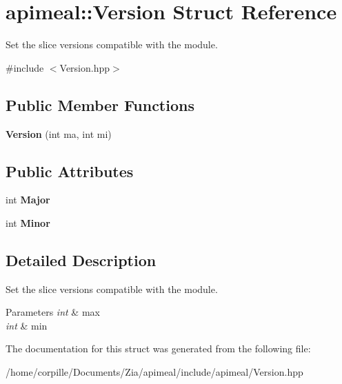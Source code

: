 \hypertarget{structapimeal_1_1Version}{\section{apimeal\-:\-:Version Struct Reference}
\label{structapimeal_1_1Version}
}


Set the slice versions compatible with the module.  




{\ttfamily \#include $<$Version.\-hpp$>$}

\subsection*{Public Member Functions}
\begin{DoxyCompactItemize}
\item 
\hypertarget{structapimeal_1_1Version_a2709f76d935fe5d194b469a9923b515d}{{\bfseries Version} (int ma, int mi)}\label{structapimeal_1_1Version_a2709f76d935fe5d194b469a9923b515d}

\end{DoxyCompactItemize}
\subsection*{Public Attributes}
\begin{DoxyCompactItemize}
\item 
\hypertarget{structapimeal_1_1Version_a12307d3b608a391a289fd5c3d4e74be2}{int {\bfseries Major}}\label{structapimeal_1_1Version_a12307d3b608a391a289fd5c3d4e74be2}

\item 
\hypertarget{structapimeal_1_1Version_a9f2c4435c4b0d848a7a6731f30dc4aaf}{int {\bfseries Minor}}\label{structapimeal_1_1Version_a9f2c4435c4b0d848a7a6731f30dc4aaf}

\end{DoxyCompactItemize}


\subsection{Detailed Description}
Set the slice versions compatible with the module. 


\begin{DoxyParams}{Parameters}
{\em int} & max \\
\hline
{\em int} & min \\
\hline
\end{DoxyParams}


The documentation for this struct was generated from the following file\-:\begin{DoxyCompactItemize}
\item 
/home/corpille/\-Documents/\-Zia/apimeal/include/apimeal/Version.\-hpp\end{DoxyCompactItemize}
